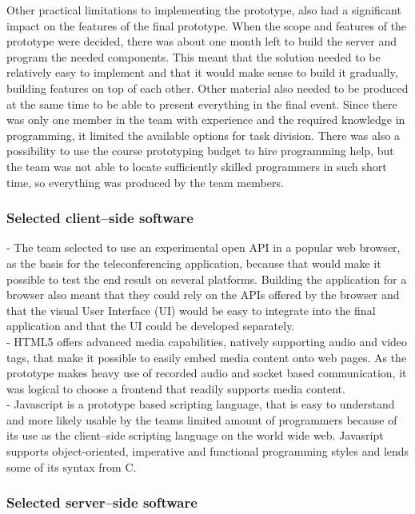 \documentclass[english,12pt,a4paper,dvips]{article}
\begin{document}
Other practical limitations to implementing the prototype, also had a significant impact on the features of the final prototype. When the scope and features of the prototype were decided, there was about one month left to build the server and program the needed components. This meant that the solution needed to be relatively easy to implement and that it would make sense to build it gradually, building features on top of each other. Other material also needed to be produced at the same time to be able to present everything in the final event. Since there was only one member in the team with experience and the required knowledge in programming, it limited the available options for task division. There was also a possibility to use the course prototyping budget to hire programming help, but the team was not able to locate sufficiently skilled programmers in such short time, so everything was produced by the team members.

\subsubsection{Selected client--side software}

- The team selected to use an experimental open API in a popular web browser, as the basis for the teleconferencing application, because that would make it possible to test the end result on several platforms. Building the application for a browser also meant that they could rely on the APIs offered by the browser and that the visual User Interface (UI) would be easy to integrate into the final application and that the UI could be developed separately. \\
- HTML5 offers advanced media capabilities, natively supporting audio and video tags, that make it possible to easily embed media content onto web pages. As the prototype makes heavy use of recorded audio and socket based communication, it was logical to choose a frontend that readily supports media content. \\
- Javascript is a prototype based scripting language, that is easy to understand and more likely usable by the teams limited amount of programmers because of its use as the client--side scripting language on the world wide web. Javasript supports object-oriented, imperative and functional programming styles and lends some of its syntax from C.


\subsubsection{Selected server--side software}
\end{document}
